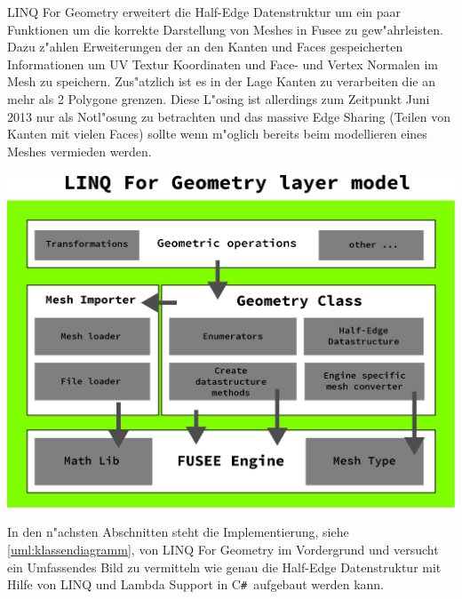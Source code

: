 \documentclass[pagesize, paper=a4, fontsize=12pt,titlepage=true, headings=small, headnosepline, abstractoff, liststotoc, nochapterprefix, plainheadsepline]{scrreprt}
\newcommand{\CSS}{C\texttt{\# }}
\newcommand{\LFGS}{LINQ For Geometry }
\newcommand{\HES}{Half-Edge Datenstruktur }
\begin{document}
\LFGS erweitert die \HES um ein paar Funktionen um die korrekte Darstellung von Meshes in Fusee zu gew"ahrleisten. Dazu z"ahlen Erweiterungen der an den Kanten und Faces gespeicherten Informationen um UV Textur Koordinaten und Face- und Vertex Normalen im Mesh zu speichern.
Zus"atzlich ist es in der Lage Kanten zu verarbeiten die an mehr als 2 Polygone grenzen. Diese L"osing ist allerdings zum Zeitpunkt Juni 2013 nur als Notl"osung zu betrachten und das massive Edge Sharing (Teilen von Kanten mit vielen Faces) sollte wenn m"oglich bereits beim modellieren eines Meshes vermieden werden.
\newline

\includegraphics[width=\linewidth]{../Bilder/LFGLayer}
\label{pic:LFGLayer} 


In den n"achsten Abschnitten steht die Implementierung, siehe \ref{uml:klassendiagramm}, von \LFGS im Vordergrund und versucht ein Umfassendes Bild zu vermitteln wie genau die \HES mit Hilfe von LINQ und Lambda Support in \CSS aufgebaut werden kann.
\newline
\end{document}
